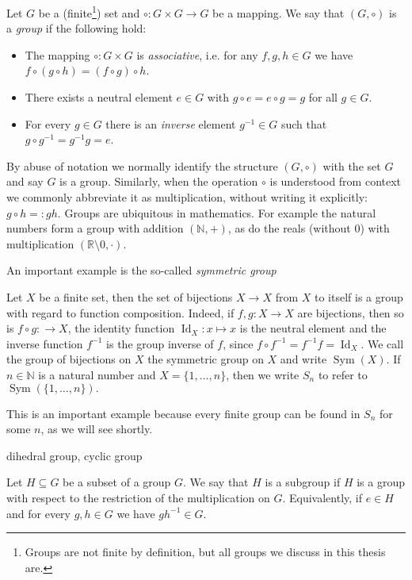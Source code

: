 \begin{defn}
 Let $G$ be a (finite\footnote{Groups are not finite by definition, but all groups we discuss in this thesis are.}) set and $ \circ : G \times G \rightarrow G$ be a mapping. 
We say that $(G, \circ)$ is a \emph{group} if the following hold:
\begin{itemize}
\item The mapping $\circ : G \times G$ is \emph{associative}, i.e. for any $f,g,h \in G$ we have $f \circ (g \circ h) = (f \circ g) \circ h$.
\item There exists a neutral element $e \in G$ with $g \circ e = e \circ g = g$ for all $g \in G$.
\item For every $g \in G$ there is an \emph{inverse} element $g^{-1} \in G$ such that $g \circ g^{-1} = g^{-1} g = e$.
\end{itemize}
\end{defn}
By abuse of notation we normally identify the structure $(G,\circ)$ with the set $G$ and say $G$ is a group.
Similarly, when the operation $\circ$ is understood from context we commonly abbreviate it as multiplication, without writing it explicitly: $g \circ h =: gh$.
Groups are ubiquitous in mathematics. For example the natural numbers form a group with addition $(\mathbb{N},+)$, as do the reals (without 0) with multiplication $(\mathbb{R}\setminus{0},\cdot)$.

An important example is the so-called \emph{symmetric group}
\begin{ex}
Let $X$ be a finite set, then the set of bijections $X \rightarrow X$ from $X$ to itself is a group with regard to function composition.
Indeed, if $f,g : X \rightarrow X$ are bijections, then so is $f \circ g :  \rightarrow X$, the identity function $\operatorname{Id}_X : x \mapsto x$ is the neutral element and the inverse function $f^{-1}$ is the group inverse of $f$,
since $f \circ f^{-1} = f^{-1} f = \operatorname{Id}_X.$ We call the group of bijections on $X$ the symmetric group on $X$ and write $\operatorname{Sym}(X)$.
If $n \in \mathbb{N}$ is a natural number and $X = \{ 1 ,\ldots, n \}$, then we write $S_n$ to refer to $\operatorname{Sym}(\{1,\ldots,n\}).$
\end{ex}
This is an important example because every finite group can be found in $S_n$ for some $n$, as we will see shortly.

dihedral group, cyclic group

\begin{defn}
Let $H \subseteq G$ be a subset of a group $G$.
We say that $H$ is a subgroup if $H$ is a group with respect to the restriction of the multiplication on $G$.
Equivalently, if $e \in H$ and for every $g, h \in G$ we have $g h^{-1} \in G$.
\end{defn}

